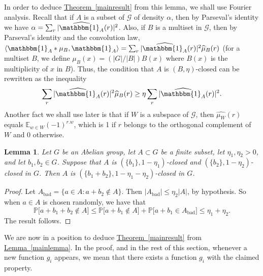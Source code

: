 \documentclass[11pt]{article}
\numberwithin{equation}{section}
\newtheorem{lemma}[theorem]{Lemma}
\theoremstyle{definition}
\theoremstyle{plain}
\newcommand{\expref}[2]{\hyperref[#2]{#1~\ref{#2}}}
\newcommand\E{\mathbb{E}}
\renewcommand\a{\alpha}
\newcommand{\ind}{\mathbbm{1}}
\renewcommand\AA{\ind_A}
\newcommand \cG{\mathcal G}
\begin{document}
In order to deduce \expref{Theorem}{mainresult} from this lemma, we shall use Fourier analysis. Recall that if $A$ is a subset of $\cG$ of density $\a$, then by Parseval's identity we have $\a=\sum_r|\widehat{\AA}(r)|^2$. Also, if $B$ is a multiset in $\cG$, then by Parseval's identity and the convolution law, $\langle \AA*\mu_B,\AA\rangle=\sum_r|\widehat{\AA}(r)|^2\widehat\mu_B(r)$ (for a multiset $B$, we define $\mu_B(x)= ({|G|}/{|B|}) B(x)$ where $B(x)$ is the multiplicity of $x$ in $B$). Thus, the condition that $A$ is $(B,\eta)$-closed can be rewritten as the inequality 
\[\sum_r|\widehat{\AA}(r)|^2\widehat\mu_B(r)\geq\eta\sum_r|\widehat{\AA}(r)|^2.\]
Another fact we shall use later is that if $W$ is a subspace of $\cG$, then $\widehat{\mu_W}(r)$ equals $\E_{w\in W}(-1)^{r.w}$, which is 1 if $r$ belongs to the orthogonal complement of $W$ and 0 otherwise.

\begin{lemma}\label{triangle}
	Let $G$ be an Abelian group, let $A\subset G$ be a finite subset, let $\eta_1,\eta_2>0$, and let $b_1,b_2\in G$. Suppose that $A$ is $(\{b_1\},1-\eta_1)$-closed and $(\{b_2\},1-\eta_2)$-closed in $G$. Then $A$ is $(\{b_1+b_2\},1-\eta_1-\eta_2)$-closed in $G$.
\end{lemma}

\begin{proof}
	Let $A_{\text{bad}}=\{a\in A: a+b_2\not \in A\}$. Then $|A_{\text{bad}}|\leq \eta_2|A|$, by hypothesis. So when $a\in A$ is chosen randomly, we have that 
	\[\mathbb{P}\lbrack a+b_1+b_2\not \in A \rbrack \leq \mathbb{P}\lbrack a+b_1\not\in A\rbrack+\mathbb{P}\lbrack a+b_1\in A_{\text{bad}}\rbrack\leq \eta_1+\eta_2.\]
	The result follows.
\end{proof}

We are now in a position to deduce \expref{Theorem}{mainresult} from \expref{Lemma}{mainlemma}. In the proof, and in the rest of this section, whenever a new function $g_i$ appears, we mean that there exists a function $g_i$ with the claimed property.
\end{document}
